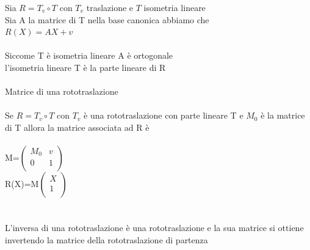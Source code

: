 \documentclass{article}
\begin{document}
Sia \(R=T_v \circ T\) con \(T_v\) traslazione e \(T\) isometria lineare\\
Sia A la matrice di T nella base canonica abbiamo che\\
\(R(X)= AX+v\)\\\\
Siccome T è isometria lineare A è ortogonale\\
l'isometria lineare T è la parte lineare di R\\\\
{\large Matrice di una rototraslazione}\\\\
Se \(R=T_v \circ T\) con \(T_v\) è una rototraslazione con parte lineare T e \(M_0\) è la matrice di T allora la matrice associata ad R è \\\\
M=\(\left( \begin{array}{cc}
	M_0 & v \\
	0 & 1 \\
\end{array}\right) \)\\
R(X)=M\(\left( \begin{array}{c}
	X\\
	1\\
\end{array}\right) \)\\\\\\
L'inversa di una rototraslazione è una rototraslazione e la sua matrice si ottiene invertendo la matrice della rototraslazione di partenza\\
\end{document}

